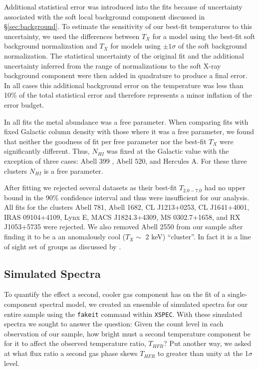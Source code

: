 \documentclass{emulateapj}
\begin{document}
Additional statistical error was introduced into the fits because of
uncertainty associated with the soft local background component
discussed in \S\ref{sec:background}. To estimate the sensitivity of
our best-fit temperatures to this uncertainty, we used the differences
between $T_{X}$ for a model using the best-fit soft background
normalization and $T_{X}$ for models using $\pm1\sigma$ of the soft
background normalization. The statistical uncertainty of the original
fit and the additional uncertainty inferred from the range of
normalizations to the soft X-ray background component were then added
in quadrature to produce a final error. In all cases this additional
background error on the temperature was less than 10\% of the total
statistical error and therefore represents a minor inflation of the
error budget.

In all fits the metal abundance was a free parameter. When comparing
fits with fixed Galactic column density with those where it
was a free parameter, we found that neither the goodness of fit per
free parameter nor the best-fit $T_{X}$ were significantly different. Thus,
$N_{HI}$ was fixed at the Galactic value with the exception of three
cases: Abell 399 \citep{2004MNRAS.351.1439S}, Abell 520, and Hercules
A. For these three clusters $N_{HI}$ is a free parameter.

After fitting we rejected several datasets as their best-fit $T_{2.0-7.0}$
had no upper bound in the 90\% confidence interval and thus were
insufficient for our analysis. All fits for the clusters Abell 781,
Abell 1682, CL J1213+0253, CL J1641+4001, IRAS 09104+4109, Lynx E,
MACS J1824.3+4309, MS 0302.7+1658, and RX J1053+5735 were rejected. We
also removed Abell 2550 from our sample after finding it to be a an
anomalously cool ($T_{X} \sim$ 2 keV) ``cluster''. In fact it is a line
of sight set of groups as discussed by \cite{2004cgpc.sympE..31M}.

\subsection{Simulated Spectra}\label{sec:simulated}

To quantify the effect a second, cooler gas component has on the fit
of a single-component spectral model, we created an ensemble of simulated
spectra for our entire sample using the {\tt fakeit} command within
{\tt XSPEC}. With these simulated spectra we sought to answer the
question: Given the count level in each observation of our sample, how
bright must a second temperature component be for it to affect the
observed temperature ratio, $T_{HFR}$? Put another way, we asked at
what flux ratio a second gas phase skews $T_{HFR}$ to greater than unity at
the 1$\sigma$ level.
\end{document}
